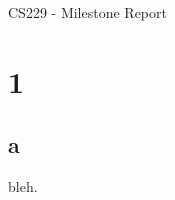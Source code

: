 \documentclass[10]{article}
\begin{document}
\begin{center}
CS229 - Milestone Report \\
\end{center}
\section*{1}
\subsection*{a}
bleh. \\
\end{document}
